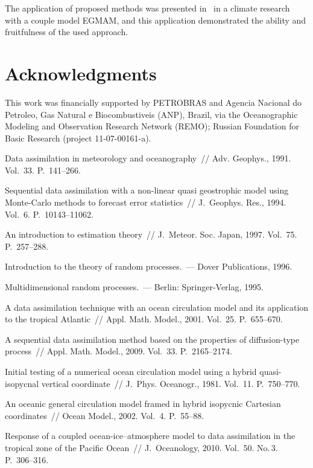 \begin{multicols}{2}
The application of proposed methods was presented in~\cite{10-b} in a climate research 
with a couple model EGMAM, and this application demonstrated the ability and fruitfulness 
of the used approach.

\section*{Acknowledgments}

\noindent
This work was financially supported by PETROBRAS and Agencia Nacional do Petroleo, 
Gas Natural e Biocombustiveis (ANP), Brazil, via the Oceanographic Modeling and 
Observation Research Network (REMO); Russian Foundation for Basic Research (project  11-07-00161-a).

{\small\frenchspacing
{%
\begin{thebibliography}{99}



Data assimilation in meteorology and oceanography~// Adv. Geophys., 1991.  Vol.~33.
P.~141--266.

Sequential data assimilation with a non-linear quasi geostrophic model using Monte-Carlo 
methods to forecast error statistics~// J.~Geophys. Res., 1994. Vol.~6. P.~10143--11062.

An introduction to estimation theory~// J.~Meteor. Soc. Japan, 1997. Vol.~75. P.~257--288.

Introduction to the theory of random processes.~--- Dover Publications, 1996.

Multidimensional random processes.~--- Berlin: Springer-Verlag, 1995.

A data assimilation technique with an ocean circulation model and its application to the 
tropical Atlantic~// Appl. Math. Model., 2001. Vol.~25. P.~655--670.

A sequential data assimilation method based on the properties of diffusion-type process~//
Appl. Math. Model., 2009. Vol.~33. P.~2165--2174.

Initial testing of a numerical ocean circulation model using a hybrid 
quasi-isopycnal vertical coordinate~// J.~Phys. Oceanogr., 1981. Vol.~11. P.~750--770.

An oceanic general circulation model framed in hybrid isopycnic Cartesian coordinates~//
Ocean Model., 2002. Vol.~4. P.~55--88.


Response of a coupled ocean-ice--atmosphere model to data assimilation in the tropical 
zone of the Pacific Ocean~// J.~Oceanology, 2010. Vol.~50. No.\,3. P.~306--316.

 \end{thebibliography}
}
}


\end{multicols}

